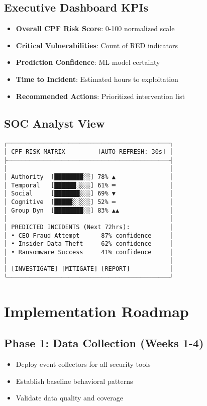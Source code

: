 \documentclass[11pt,a4paper]{article}
\begin{document}
\subsection{Executive Dashboard KPIs}

\begin{itemize}
\item \textbf{Overall CPF Risk Score}: 0-100 normalized scale
\item \textbf{Critical Vulnerabilities}: Count of RED indicators
\item \textbf{Prediction Confidence}: ML model certainty
\item \textbf{Time to Incident}: Estimated hours to exploitation
\item \textbf{Recommended Actions}: Prioritized intervention list
\end{itemize}

\subsection{SOC Analyst View}

\begin{verbatim}
┌─────────────────────────────────────────────┐
│ CPF RISK MATRIX         [AUTO-REFRESH: 30s] │
├─────────────────────────────────────────────┤
│                                             │
│ Authority  [████████░░] 78% ▲               │
│ Temporal   [██████░░░░] 61% ═               │
│ Social     [███████░░░] 69% ▼               │
│ Cognitive  [█████░░░░░] 52% ═               │
│ Group Dyn  [████████░░] 83% ▲▲              │
│                                             │
│ PREDICTED INCIDENTS (Next 72hrs):           │
│ • CEO Fraud Attempt      87% confidence     │
│ • Insider Data Theft     62% confidence     │
│ • Ransomware Success     41% confidence     │
│                                             │
│ [INVESTIGATE] [MITIGATE] [REPORT]           │
└─────────────────────────────────────────────┘
\end{verbatim}

\section{Implementation Roadmap}

\subsection{Phase 1: Data Collection (Weeks 1-4)}
\begin{itemize}
\item Deploy event collectors for all security tools
\item Establish baseline behavioral patterns
\item Validate data quality and coverage
\end{itemize}
\end{document}
